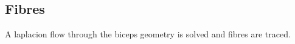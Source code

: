 %
\clearpage
%
%
%

\begin{frame}
\section{Fibres}
%
A laplacion flow through the biceps geometry is solved and fibres are traced.
\end{frame}


%
%
\begin{frame}{}
\end{frame}
